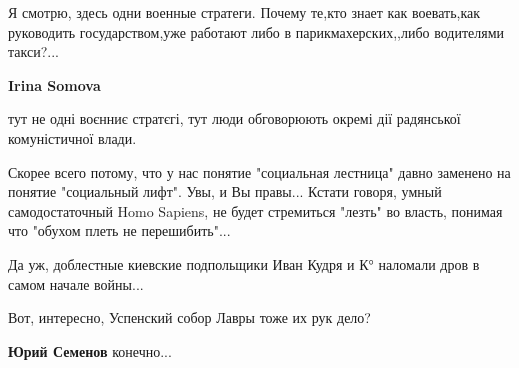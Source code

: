 \begin{itemize}
Я смотрю, здесь одни военные стратеги.
Почему те,кто знает как воевать,как руководить государством,уже работают либо в парикмахерских,,либо водителями такси?...

\begin{itemize}
 
\textbf{Irina Somova} 

тут не одні воєнниє стратєгі, тут люди обговорюють окремі дії радянської
комуністичної влади.



 

Скорее всего потому, что у нас понятие "социальная лестница" давно заменено на
понятие "социальный лифт". Увы, и Вы правы... Кстати говоря, умный
самодостаточный Homo Sapiens, не будет стремиться "лезть" во власть, понимая
что "обухом плеть не перешибить"...

\end{itemize}

 

Да уж, доблестные киевские подпольщики Иван Кудря и К° наломали дров в самом
начале войны...

Вот, интересно, Успенский собор Лавры тоже их рук дело?

\begin{itemize}
 
\textbf{Юрий Семенов} конечно...

\begin{itemize}
 

\end{itemize}
\end{itemize}
\end{itemize}
